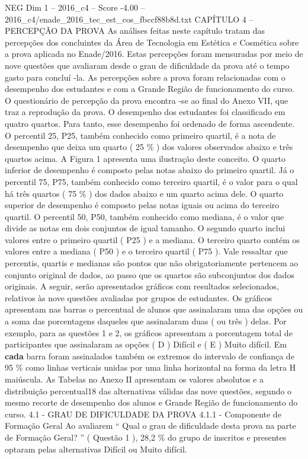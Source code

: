 \begin{textsample}{NEG Dim 1 – 2016\_c4 – Score -4.00 – 2016\_c4/enade\_2016\_tec\_est\_cos\_fbccf88b8d.txt}  \label{ex:f1_neg_160}
CAPÍTULO 4 – PERCEPÇÃO DA PROVA As análises feitas neste capítulo tratam das percepções dos concluintes da Área de Tecnologia em Estética e Cosmética sobre a prova aplicada no Enade/2016.
Estas percepções foram mensuradas por meio de nove questões que avaliaram desde o grau de dificuldade da prova até o tempo gasto para concluí -la.
As percepções sobre a prova foram relacionadas com o desempenho dos estudantes e com a Grande Região de funcionamento do curso.
O questionário de percepção da prova encontra -se ao final do Anexo VII, que traz a reprodução da prova.
O desempenho dos estudantes foi classificado em quatro quartos.
Para tanto, esse desempenho foi ordenado de forma ascendente.
O percentil 25, P25, também conhecido como primeiro quartil, é a nota de desempenho que deixa um quarto ( 25 \% ) dos valores observados abaixo e três quartos acima.
A Figura 1 apresenta uma ilustração deste conceito.
O quarto inferior de desempenho é composto pelas notas abaixo do primeiro quartil.
Já o percentil 75, P75, também conhecido como terceiro quartil, é o valor para o qual há três quartos ( 75 \% ) dos dados abaixo e um quarto acima dele.
O quarto superior de desempenho é composto pelas notas iguais ou acima do terceiro quartil.
O percentil 50, P50, também conhecido como mediana, é o valor que divide as notas em dois conjuntos de igual tamanho.
O segundo quarto inclui valores entre o primeiro quartil ( P25 ) e a mediana.
O terceiro quarto contém os valores entre a mediana ( P50 ) e o terceiro quartil ( P75 ).
Vale ressaltar que percentis, quartis e medianas são pontos que não obrigatoriamente pertencem ao conjunto original de dados, ao passo que os quartos são subconjuntos dos dados originais.
A seguir, serão apresentados gráficos com resultados selecionados, relativos às nove questões avaliadas por grupos de estudantes.
Os gráficos apresentam nas barras o percentual de alunos que assinalaram uma das opções ou a soma das porcentagens daqueles que assinalaram duas ( ou três ) delas.
Por exemplo, para as questões 1 e 2, os gráficos apresentam a porcentagem total de participantes que assinalaram as opções ( D ) Difícil e ( E ) Muito difícil.
Em \textbf{cada} barra foram assinalados também os extremos do intervalo de confiança de 95 \% como linhas verticais unidas por uma linha horizontal na forma da letra H maiúscula.
As Tabelas no Anexo II apresentam os valores absolutos e a distribuição percentual18 das alternativas válidas das nove questões, segundo o mesmo recorte de desempenho dos alunos e Grande Região de funcionamento do curso. 4.1 - GRAU DE DIFICULDADE DA PROVA 4.1.1 - Componente de Formação Geral Ao avaliarem “ Qual o grau de dificuldade desta prova na parte de Formação Geral? ” ( Questão 1 ), 28,2 \% do grupo de inscritos e presentes optaram pelas alternativas Difícil ou Muito difícil.

\end{textsample}
